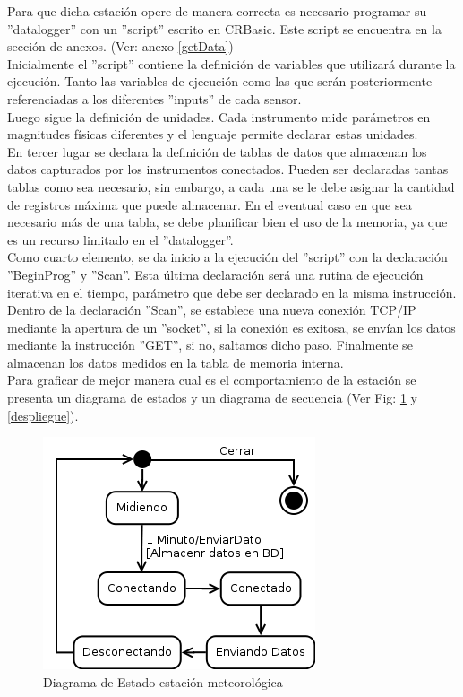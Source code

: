 Para que dicha estación opere de manera correcta es necesario programar su ''datalogger'' con un ''script'' escrito en CRBasic. Este script se encuentra en la sección de anexos. (Ver: anexo \ref{getData})\\

Inicialmente el ''script'' contiene la definición de variables que utilizará durante la ejecución. Tanto las variables de ejecución como las que serán posteriormente referenciadas a los diferentes ''inputs'' de cada sensor.\\
Luego sigue la definición de unidades. Cada instrumento mide parámetros en magnitudes físicas diferentes y el lenguaje permite declarar estas unidades.\\
En tercer lugar se declara la definición de tablas de datos que almacenan los datos capturados por los instrumentos conectados. Pueden ser declaradas tantas tablas como sea necesario, sin embargo, a cada una se le debe asignar la cantidad de registros máxima que puede almacenar. En el eventual caso en que sea necesario más de una tabla, se debe planificar bien el uso de la memoria, ya que es un recurso limitado en el ''datalogger''.\\
Como cuarto elemento, se da inicio a la ejecución del ''script'' con la declaración ''BeginProg'' y ''Scan''. Esta última declaración será una rutina de ejecución iterativa en el tiempo, parámetro que debe ser declarado en la misma instrucción.\\
Dentro de la declaración ''Scan'', se establece una nueva conexión TCP/IP mediante la apertura de un ''socket'', si la conexión es exitosa, se envían los datos mediante la instrucción ''GET'', si no, saltamos dicho paso. Finalmente se almacenan los datos medidos en la tabla de memoria interna.\\

Para graficar de mejor manera cual es el comportamiento de la estación se presenta un diagrama de estados y un diagrama de secuencia (Ver Fig: \ref{estacionEstados} y \ref{despliegue}).

\begin{figure}[h!]
        \centering
        \includegraphics[scale=0.6]{images/estacionEstados}
        \caption{Diagrama de Estado estación meteorológica}
        \label{estacionEstados}
\end{figure}

